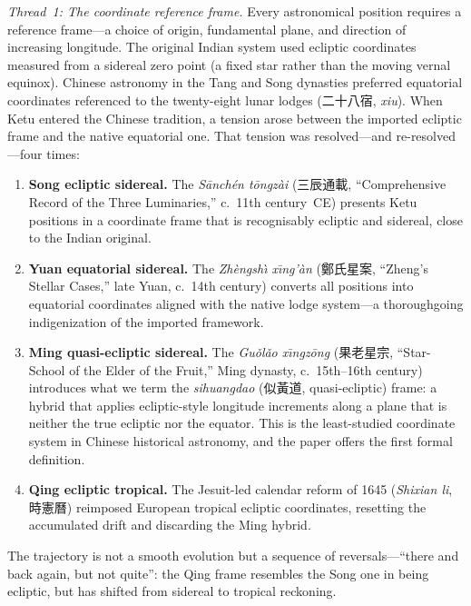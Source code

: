 \documentclass[10pt,a4paper]{article}
\newcommand{\zh}[1]{#1}
\begin{document}
\textit{Thread~1: The coordinate reference frame.}  Every astronomical position
requires a reference frame---a choice of origin, fundamental plane, and direction
of increasing longitude.  The original Indian system used ecliptic coordinates
measured from a sidereal zero point (a fixed star rather than the moving
vernal equinox).  Chinese astronomy in the Tang and Song dynasties preferred
equatorial coordinates referenced to the twenty-eight lunar lodges (\zh{二十八宿},
\textit{xiu}).  When Ketu entered the Chinese tradition, a tension arose between
the imported ecliptic frame and the native equatorial one.  That tension was
resolved---and re-resolved---four times:
\begin{enumerate}[leftmargin=*, label=(\arabic*)]
  \item \textbf{Song ecliptic sidereal.}  The \textit{S\={a}nch\'{e}n t\={o}ngz\`{a}i} (\zh{三辰通載}, ``Comprehensive Record of the Three Luminaries,'' c.~11th century~CE)
    presents Ketu positions in a coordinate frame that is recognisably ecliptic
    and sidereal, close to the Indian original.
  \item \textbf{Yuan equatorial sidereal.}  The \textit{Zh\`{e}ngsh\`{\i} x\={\i}ng'\`{a}n} (\zh{鄭氏星案}, ``Zheng's Stellar Cases,'' late Yuan, c.~14th
    century) converts all positions into equatorial coordinates aligned with the
    native lodge system---a thoroughgoing indigenization of the imported framework.
  \item \textbf{Ming quasi-ecliptic sidereal.}  The \textit{Gu\v{o}l\v{a}o x\={\i}ngz\={o}ng} (\zh{果老星宗}, ``Star-School of the Elder of the Fruit,'' Ming dynasty,
    c.~15th--16th century) introduces what we term the \textit{sihuangdao} (\zh{似黃道}, quasi-ecliptic)
    frame: a hybrid that applies ecliptic-style longitude increments along a plane
    that is neither the true ecliptic nor the equator.  This is the least-studied
    coordinate system in Chinese historical astronomy, and the paper offers the
    first formal definition.
  \item \textbf{Qing ecliptic tropical.}  The Jesuit-led calendar reform of 1645
    (\textit{Shixian li}, \zh{時憲曆}) reimposed European tropical ecliptic
    coordinates, resetting the accumulated drift and discarding the Ming hybrid.
\end{enumerate}
The trajectory is not a smooth evolution but a sequence of reversals---``there
and back again, but not quite'': the Qing frame resembles the Song one in being
ecliptic, but has shifted from sidereal to tropical reckoning.
\end{document}
